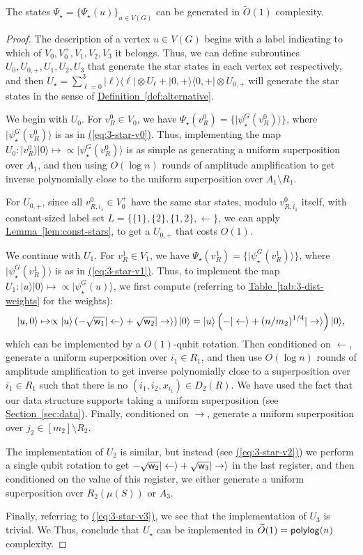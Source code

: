 \documentclass{article}
\newcommand{\eq}[1]{\hyperref[eq:#1]{(\ref*{eq:#1})}}
\renewcommand{\sec}[1]{\hyperref[sec:#1]{Section~\ref*{sec:#1}}}
\newcommand{\lem}[1]{\hyperref[lem:#1]{Lemma~\ref*{lem:#1}}}
\newcommand{\tabl}[1]{\hyperref[tab:#1]{Table~\ref*{tab:#1}}}
\newcommand{\defin}[1]{\hyperref[def:#1]{Definition~\ref*{def:#1}}}
\def\ket#1{{\lvert}#1\rangle}
\def\bra#1{{\langle}#1\rvert}
\renewcommand{\>}{\rangle}
\newcommand{\<}{\langle}
\renewcommand{\(}{\left(}
\renewcommand{\)}{\right)}
\def\w{{\sf w}}
\begin{document}
\begin{lemma}\label{lem:3-dist-star-states}
The states $\Psi_\star=\{\Psi_\star(u)\}_{u\in V(G)}$ can be generated in $\widetilde{O}(1)$ complexity. 
\end{lemma}
\begin{proof}
The description of a vertex $u\in V(G)$ begins with a label indicating to which of $V_0,V_0^+,V_1,V_2,V_3$ it belongs. 
Thus, we can define subroutines $U_0,U_{0,+},U_1,U_2,U_3$ that generate the star states in each vertex set respectively,
and then $U_\star=\sum_{\ell = 0}^3\ket{\ell}\bra{\ell}\otimes U_{\ell} + \ket{0,+}\bra{0,+}\otimes U_{0,+}$ will generate the star states in the sense of \defin{alternative}. 

We begin with $U_0$. For $v^0_{R}\in V_0$, we have $\Psi_\star(v^0_R)=\{\ket{\psi_\star^G(v^0_R)}\}$, where $\ket{\psi_\star^G(v^0_R)}$ is as in \eq{3-star-v0}. Thus, implementing the map $U_0: \ket{v^0_R}\ket{0}\mapsto \propto \ket{\psi_\star^G(v^0_R)}$ is as simple as generating a uniform superposition over $A_1$, and then using $O(\log n)$ rounds of amplitude amplification to get inverse polynomially close to the uniform superposition over $A_1\setminus R_1$. 

For $U_{0,+}$, since all $v_{R,i_1}^0\in V_0^{+}$ have the same star states, modulo $v_{R,i_1}^0$ itself, with constant-sized label set $L=\{\{1\},\{2\},\{1,2\},\leftarrow\}$, we can apply \lem{const-stars}, to get a $U_{0,+}$ that costs $O(1)$. 

We continue with $U_1$. For $v^1_{R}\in V_1$, we have $\Psi_\star(v^1_R)=\{\ket{\psi_\star^G(v^1_R)}\}$, where $\ket{\psi_\star^G(v^1_R)}$ is as in \eq{3-star-v1}. Thus, to implement the map $U_1: \ket{u}\ket{0}\mapsto \propto \ket{\psi_\star^G(u)}$, we first compute (referring to \tabl{3-dist-weights} for the weights):
$$\ket{u,0}\mapsto\propto \ket{u}\left(-\sqrt{\w_1}\ket{\leftarrow}+\sqrt{\w_2}\ket{\rightarrow}\right)\ket{0}=\ket{u}\left(-\ket{\leftarrow}+(n/m_2)^{1/4}\ket{\rightarrow}\right)\ket{0},$$
which can be implemented by a $O(1)$-qubit rotation. Then conditioned on $\leftarrow$, generate a uniform superposition over $i_1\in R_1$, and then use $O(\log n)$ rounds of amplitude amplification to get inverse polynomially close to a superposition over $i_1\in R_1$ such that there is no $(i_1,i_2,x_{i_1})\in D_2(R)$. We have used the fact that our data structure supports taking a uniform superposition (see \sec{data}). Finally, conditioned on $\rightarrow$, generate a uniform superposition over $j_2\in [m_2]\setminus R_2$. 

The implementation of $U_2$ is similar, but instead (see \eq{3-star-v2}) we perform a single qubit rotation to get $-\sqrt{\w_2}\ket{\leftarrow}+\sqrt{\w_3}\ket{\rightarrow}$ in the last register, and then conditioned on the value of this register, we either generate a uniform superposition over $R_2(\mu(S))$ or $A_3$.

Finally, referring to \eq{3-star-v3}, we see that the implementation of $U_3$ is trivial.
We Thus, conclude that $U_\star$ can be implemented in $\widetilde{O}(1)={\sf polylog}(n)$ complexity.
\end{proof}
\end{document}
